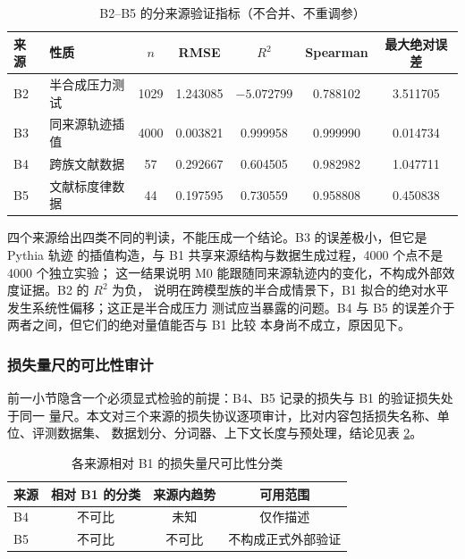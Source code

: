 \documentclass[bwprint]{gmcmthesis}
\numberwithin{equation}{section}
\numberwithin{figure}{section}
\numberwithin{table}{section}
\begin{document}
\begin{table}[htp!]
\centering
\renewcommand\arraystretch{1.2}
\caption{B2--B5 的分来源验证指标（不合并、不重调参）}\label{tab:q2-val}
\begin{tabular*}{\textwidth}{@{\extracolsep{\fill}}llccccc@{}}
\toprule
来源 & 性质 & $n$ & RMSE & $R^2$ & Spearman & 最大绝对误差 \\
\midrule
B2 & 半合成压力测试 & 1029 & 1.243085 & $-5.072799$ & 0.788102 & 3.511705 \\
B3 & 同来源轨迹插值 & 4000 & 0.003821 & 0.999958 & 0.999990 & 0.014734 \\
B4 & 跨族文献数据 & 57 & 0.292667 & 0.604505 & 0.982982 & 1.047711 \\
B5 & 文献标度律数据 & 44 & 0.197595 & 0.730559 & 0.958808 & 0.450838 \\
\bottomrule
\end{tabular*}
\end{table}

四个来源给出四类不同的判读，不能压成一个结论。B3 的误差极小，但它是 Pythia 轨迹
的插值构造，与 B1 共享来源结构与数据生成过程，4000 个点不是 4000 个独立实验；
这一结果说明 M0 能跟随同来源轨迹内的变化，不构成外部效度证据。B2 的 $R^2$ 为负，
说明在跨模型族的半合成情景下，B1 拟合的绝对水平发生系统性偏移；这正是半合成压力
测试应当暴露的问题。B4 与 B5 的误差介于两者之间，但它们的绝对量值能否与 B1 比较
本身尚不成立，原因见下。

\subsubsection{损失量尺的可比性审计}

前一小节隐含一个必须显式检验的前提：B4、B5 记录的损失与 B1 的验证损失处于同一
量尺。本文对三个来源的损失协议逐项审计，比对内容包括损失名称、单位、评测数据集、
数据划分、分词器、上下文长度与预处理，结论见表 \ref{tab:q2-protocol}。

\begin{table}[htp!]
\centering
\renewcommand\arraystretch{1.2}
\caption{各来源相对 B1 的损失量尺可比性分类}\label{tab:q2-protocol}
\begin{tabular*}{\textwidth}{@{\extracolsep{\fill}}lccc@{}}
\toprule
来源 & 相对 B1 的分类 & 来源内趋势 & 可用范围 \\
\midrule
B4 & 不可比 & 未知 & 仅作描述 \\
B5 & 不可比 & 不可比 & 不构成正式外部验证 \\
\bottomrule
\end{tabular*}
\end{table}
\end{document}
